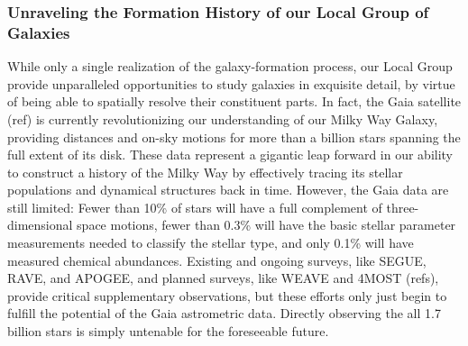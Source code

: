 \documentclass[oneside,11pt]{amsart}
\newcommand{\comment}[2][todo]{{\color{#1}[[{\bf #2}]]}}
\begin{document}
%
%
%
%
%
%



\subsubsection{Unraveling the Formation History of our Local Group of Galaxies}
\label{sec:localgroup}
\noindent \comment{1 page}

While only a single realization of the galaxy-formation process, our
Local Group provide unparalleled opportunities to study galaxies in
exquisite detail, by virtue of being able to spatially resolve their
constituent parts.  In fact, the Gaia satellite (ref) is currently
revolutionizing our understanding of our Milky Way Galaxy, providing
distances and on-sky motions for more than a billion stars spanning the
full extent of its disk.  These data represent a gigantic leap forward
in our ability to construct a history of the Milky Way by effectively
tracing its stellar populations and dynamical structures back in time.
However, the Gaia data are still limited: Fewer than 10\% of stars will
have a full complement of three-dimensional space motions, fewer than
0.3\% will have the basic stellar parameter measurements needed to
classify the stellar type, and only 0.1\% will have measured chemical
abundances.  Existing and ongoing surveys, like SEGUE, RAVE, and APOGEE,
and planned surveys, like WEAVE and 4MOST (refs), provide critical
supplementary observations, but these efforts only just begin to fulfill
the potential of the Gaia astrometric data.  Directly observing the all
1.7 billion stars is simply untenable for the foreseeable future.
\end{document}
